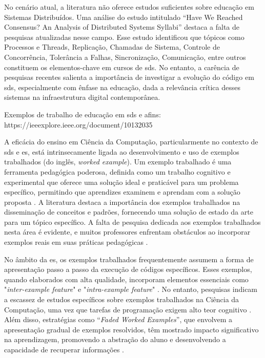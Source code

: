 No cenário atual, a literatura não oferece estudos suficientes sobre educação em Sistemas Distribuídos. Uma análise do estudo intitulado ``Have We Reached Consensus? An Analysis of Distributed Systems Syllabi'' \cite{HaveWeReachedConsensus} destaca a falta de pesquisas atualizadas nesse campo. Esse estudo identificou que tópicos como Processos e Threads, Replicação, Chamadas de Sistema, Controle de Concorrência, Tolerância a Falhas, Sincronização, Comunicação, entre outros constituem os elementos-chave em cursos de \gls{sds}. No entanto, a carência de pesquisas recentes salienta a importância de investigar a evolução do código em \gls{sds}, especialmente com ênfase na educação, dada a relevância crítica desses sistemas na infraestrutura digital contemporânea.

Exemplos de trabalho de educação em \gls{sds} e afins: https://ieeexplore.ieee.org/document/10132035

A eficácia do ensino em Ciência da Computação, particularmente no contexto de \gls{sds} e \gls{es}, está intrinsecamente ligada ao desenvolvimento e uso de exemplos trabalhados (do inglês, \textit{worked example}). Um exemplo trabalhado é uma ferramenta pedagógica poderosa, definida como um trabalho cognitivo e experimental que oferece uma solução ideal e praticável para um problema específico, permitindo que aprendizes examinem e aprendam com a solução proposta \cite{Robert.Atkinson-etal:2000}. A literatura destaca a importância dos exemplos trabalhados na disseminação de conceitos e padrões, fornecendo uma solução de estado da arte para um tópico específico. A falta de pesquisa dedicada aos exemplos trabalhados nesta área é evidente, e muitos professores enfrentam obstáculos ao incorporar exemplos reais em suas práticas pedagógicas \cite{Simone.Tonhao-etal:2021}.

No âmbito da \gls{es}, os exemplos trabalhados frequentemente assumem a forma de apresentação passo a passo da execução de códigos específicos. Esses exemplos, quando elaborados com alta qualidade, incorporam elementos essenciais como "\textit{inter-example feature}" e "\textit{intra-example feature}" \cite{Robert.Atkinson-etal:2000}. No entanto, pesquisas indicam a escassez de estudos específicos sobre exemplos trabalhados na Ciência da Computação, uma vez que tarefas de programação exigem alto teor cognitivo \cite{Skudder-LuxtonReilly:2014}. Além disso, estratégias como ``\textit{Faded Worked Examples}'', que envolvem a apresentação gradual de exemplos resolvidos, têm mostrado impacto significativo na aprendizagem, promovendo a abstração do aluno e desenvolvendo a capacidade de recuperar informações \cite{Skudder-LuxtonReilly:2014}.

